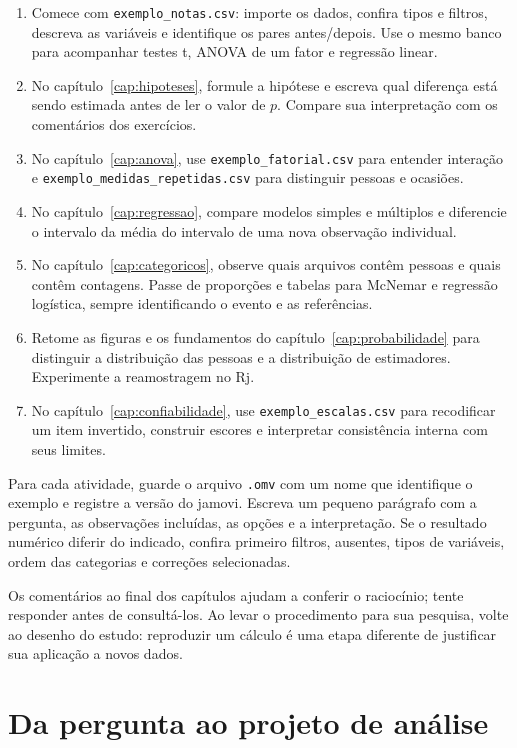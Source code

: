 \begin{enumerate}
  \item Comece com \texttt{exemplo\_notas.csv}: importe os dados, confira tipos e filtros, descreva as variáveis e identifique os pares antes/depois. Use o mesmo banco para acompanhar testes t, ANOVA de um fator e regressão linear.
  \item No capítulo~\ref{cap:hipoteses}, formule a hipótese e escreva qual diferença está sendo estimada antes de ler o valor de $p$. Compare sua interpretação com os comentários dos exercícios.
  \item No capítulo~\ref{cap:anova}, use \texttt{exemplo\_fatorial.csv} para entender interação e \texttt{exemplo\_medidas\_repetidas.csv} para distinguir pessoas e ocasiões.
  \item No capítulo~\ref{cap:regressao}, compare modelos simples e múltiplos e diferencie o intervalo da média do intervalo de uma nova observação individual.
  \item No capítulo~\ref{cap:categoricos}, observe quais arquivos contêm pessoas e quais contêm contagens. Passe de proporções e tabelas para McNemar e regressão logística, sempre identificando o evento e as referências.
  \item Retome as figuras e os fundamentos do capítulo~\ref{cap:probabilidade} para distinguir a distribuição das pessoas e a distribuição de estimadores. Experimente a reamostragem no Rj.
  \item No capítulo~\ref{cap:confiabilidade}, use \texttt{exemplo\_escalas.csv} para recodificar um item invertido, construir escores e interpretar consistência interna com seus limites.
\end{enumerate}

Para cada atividade, guarde o arquivo \texttt{.omv} com um nome que identifique o exemplo e registre a versão do jamovi. Escreva um pequeno parágrafo com a pergunta, as observações incluídas, as opções e a interpretação. Se o resultado numérico diferir do indicado, confira primeiro filtros, ausentes, tipos de variáveis, ordem das categorias e correções selecionadas.

Os comentários ao final dos capítulos ajudam a conferir o raciocínio; tente responder antes de consultá-los. Ao levar o procedimento para sua pesquisa, volte ao desenho do estudo: reproduzir um cálculo é uma etapa diferente de justificar sua aplicação a novos dados.

\section{Da pergunta ao projeto de análise}
\label{sec:projeto-reproduzivel}

